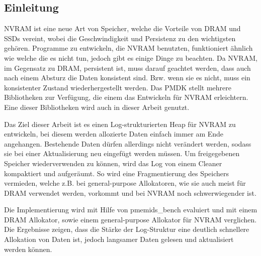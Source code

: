 \documentclass{class/thesis}
\begin{document}
  \begin{thesis}


%    
%    
%    
%    
%    
%    
%    
%    
%    
%    
%    

	\chapter{Einleitung}
	
	NVRAM ist eine neue Art von Speicher, welche die Vorteile von DRAM und SSDs vereint, wobei die Geschwindigkeit und Persistenz zu den wichtigsten gehören. 
	Programme zu entwickeln, die NVRAM benutzten, funktioniert ähnlich wie welche die es nicht tun, jedoch gibt es einige Dinge zu beachten.
	Da NVRAM, im Gegensatz zu DRAM, persistent ist, muss darauf geachtet werden, dass auch nach einem Absturz die Daten konsistent sind. Bzw. wenn sie es nicht, muss ein konsistenter Zustand wiederhergestellt werden.
	Das PMDK \cite{PMDK:Docs} stellt mehrere Bibliotheken zur Verfügung, die einem das Entwickeln für NVRAM erleichtern. Eine dieser Bibliotheken wird auch in dieser Arbeit genutzt.
	
	Das Ziel dieser Arbeit ist es einen Log-strukturierten Heap für NVRAM zu entwickeln, bei diesem werden allozierte Daten einfach immer am Ende angehangen. 
	Bestehende Daten dürfen allerdings nicht verändert werden, sodass sie bei einer Aktualisierung neu eingefügt werden müssen. 
	Um freigegebenen Speicher wiederverwenden zu können, wird das Log von einem Cleaner kompaktiert und aufgeräumt.
	So wird eine Fragmentierung des Speichers vermieden, welche z.B. bei general-purpose Allokatoren, wie sie auch meist für DRAM verwendet werden, vorkommt und bei NVRAM noch schwerwiegender ist.
	
	Die Implementierung wird mit Hilfe von pmemids\_bench \cite{Bench:Git} evaluiert und mit einem DRAM Allokator, sowie einem general-purpose Allokator für NVRAM verglichen.
	Die Ergebnisse zeigen, dass die Stärke der Log-Struktur eine deutlich schnellere Allokation von Daten ist, jedoch langsamer Daten gelesen und aktualisiert werden können.
	

\end{thesis}
\end{document}
